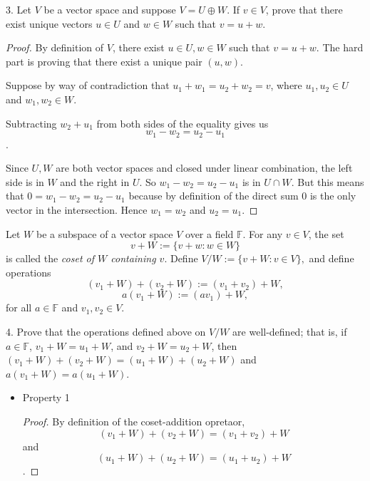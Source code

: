 \documentclass[12pt]{article} %
\newcommand{\F}{\mathbb{F}}
\begin{document}
\begin{flushleft}
\vspace{.5cm}

\pagebreak


3.  Let $V$ be a vector space and suppose $V = U \oplus W$.  If $v \in V$, prove that there exist unique vectors $u \in U$ and $w \in W$ such that $v = u + w$.

\vspace{1cm}

\begin{proof}
    By definition of $V$, there exist $u\in U, w\in W$ such that $v=u+w$. The hard part is proving that there exist a unique pair $(u, w)$.

    Suppose by way of contradiction that $u_1 + w_1 = u_2 + w_2 = v$, where $u_1, u_2 \in U$ and $w_1, w_2\in W$. 

    Subtracting $w_2 + u_1$ from both sides of the equality gives us
    $$w_1 - w_2 = u_2 - u_1 $$.

    Since $U, W$ are both vector spaces and closed under linear combination, the left side is in $W$ and the right in $U$. So $w_1 - w_2 = u_2 - u_1$ is in $U\cap W$. But this means that $0 = w_1 - w_2 = u_2 - u_1$ because by definition of the direct sum $0$ is the only vector in the intersection. Hence $w_1 = w_2$ and $u_2 = u_1$.
\end{proof}

\pagebreak

Let $W$ be a subspace of a vector space $V$ over a field $\F$.  For any $v \in V$, the set
\[v + W := \{v + w: w \in W\}\]
is called the \textit{coset of $W$ containing $v$}.  Define $V/W := \{v + W : v \in V\},$ and define operations 
\[(v_1 + W) + (v_2 + W) := (v_1 + v_2) + W,\]
\[a(v_1 + W) := (av_1) + W,\]
for all $a \in \F$ and $v_1, v_2 \in V$.
\\

\vspace{.5cm}

4.  Prove that the operations defined above on $V/W$ are well-defined; that is, if $a \in \F$, $v_1 + W = u_1 + W$, and $v_2 + W = u_2 + W$, then $(v_1 + W) + (v_2 + W) = (u_1 + W) + (u_2 + W)$ and $a(v_1 + W) = a(u_1 + W)$.

\vspace{.5cm}

\begin{itemize}
    \item Property 1


\begin{proof}
    By definition of the coset-addition opretaor,
    $$(v_1 + W) + (v_2 + W) = (v_1 + v_2) + W$$ and 
    $$(u_1 + W) + (u_2 + W) = (u_1 + u_2) + W$$.


\end{proof}
\end{itemize}
\end{flushleft}
\end{document}
